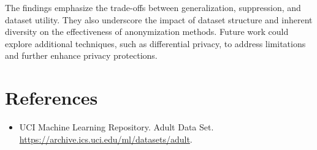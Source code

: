 \documentclass[conference]{IEEEtran}
\begin{document}
The findings emphasize the trade-offs between generalization, suppression, and dataset utility. They also underscore the impact of dataset structure and inherent diversity on the effectiveness of anonymization methods. Future work could explore additional techniques, such as differential privacy, to address limitations and further enhance privacy protections.

	
\section*{References}
\begin{itemize}
	\item UCI Machine Learning Repository. Adult Data Set. \url{https://archive.ics.uci.edu/ml/datasets/adult}.
\end{itemize}

	
\end{document}
